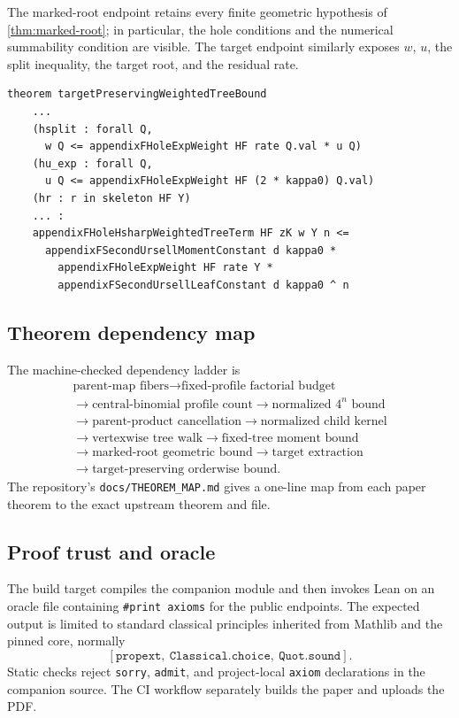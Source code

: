 \documentclass[11pt]{article}
\begin{document}
The marked-root endpoint retains every finite geometric hypothesis of \cref{thm:marked-root}; in particular, the hole conditions and the numerical summability condition are visible.  The target endpoint similarly exposes $w$, $u$, the split inequality, the target root, and the residual rate.

\begin{lstlisting}[caption={The target-preserving endpoint, abbreviated.}]
theorem targetPreservingWeightedTreeBound
    ...
    (hsplit : forall Q,
      w Q <= appendixFHoleExpWeight HF rate Q.val * u Q)
    (hu_exp : forall Q,
      u Q <= appendixFHoleExpWeight HF (2 * kappa0) Q.val)
    (hr : r in skeleton HF Y)
    ... :
    appendixFHoleHsharpWeightedTreeTerm HF zK w Y n <=
      appendixFSecondUrsellMomentConstant d kappa0 *
        appendixFHoleExpWeight HF rate Y *
        appendixFSecondUrsellLeafConstant d kappa0 ^ n
\end{lstlisting}

\subsection{Theorem dependency map}

The machine-checked dependency ladder is
\begin{equation}\label{eq:dependency-ladder}
\begin{gathered}
\text{parent-map fibers}\to\text{fixed-profile factorial budget}\\
\to\text{central-binomial profile count}\to\text{normalized }4^n\text{ bound}\\
\to\text{parent-product cancellation}\to\text{normalized child kernel}\\
\to\text{vertexwise tree walk}\to\text{fixed-tree moment bound}\\
\to\text{marked-root geometric bound}\to\text{target extraction}\\
\to\text{target-preserving orderwise bound}.
\end{gathered}
\end{equation}
The repository's \texttt{docs/THEOREM\_MAP.md} gives a one-line map from each paper theorem to the exact upstream theorem and file.

\subsection{Proof trust and oracle}

The build target compiles the companion module and then invokes Lean on an oracle file containing \texttt{\#print axioms} for the public endpoints.  The expected output is limited to standard classical principles inherited from Mathlib and the pinned core, normally
\[
  [\texttt{propext},\ \texttt{Classical.choice},\ \texttt{Quot.sound}].
\]
Static checks reject \texttt{sorry}, \texttt{admit}, and project-local \texttt{axiom} declarations in the companion source.  The CI workflow separately builds the paper and uploads the PDF.
\end{document}

